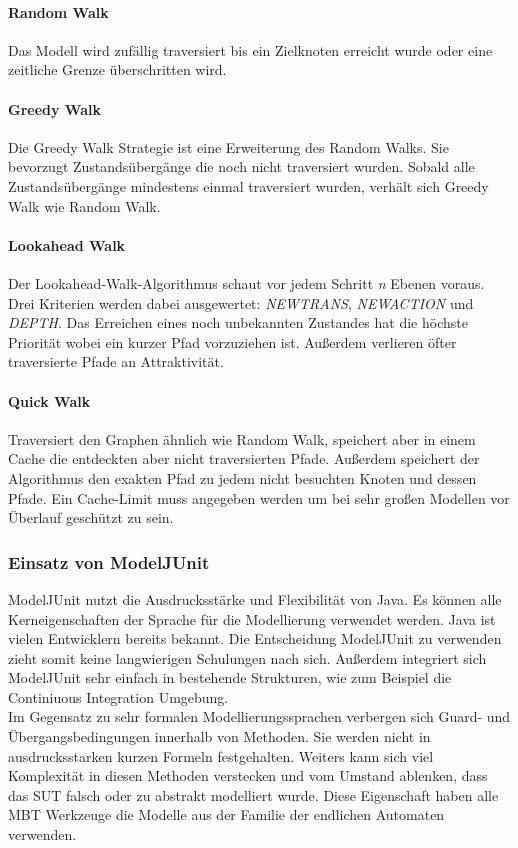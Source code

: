 
\paragraph{Random Walk}
Das Modell wird zufällig traversiert bis ein Zielknoten erreicht wurde oder eine zeitliche Grenze überschritten wird.

\paragraph{Greedy Walk}
Die Greedy Walk Strategie ist eine Erweiterung des Random Walks. Sie bevorzugt Zustandsübergänge die noch nicht traversiert wurden. Sobald alle Zustandsübergänge mindestens einmal traversiert wurden, verhält sich Greedy Walk wie Random Walk.

\paragraph{Lookahead Walk}
Der Lookahead-Walk-Algorithmus schaut vor jedem Schritt \textit{n} Ebenen voraus. Drei Kriterien werden dabei ausgewertet: \textit{NEWTRANS}, \textit{NEWACTION} und \textit{DEPTH}. Das Erreichen eines noch unbekannten Zustandes hat die höchste Priorität wobei ein kurzer Pfad vorzuziehen ist. Außerdem verlieren öfter traversierte Pfade an Attraktivität.

\paragraph{Quick Walk}
Traversiert den Graphen ähnlich wie Random Walk, speichert aber in einem Cache die entdeckten aber nicht traversierten Pfade. Außerdem speichert der Algorithmus den exakten Pfad zu jedem nicht besuchten Knoten und dessen Pfade. Ein Cache-Limit muss angegeben werden um bei sehr großen Modellen vor Überlauf geschützt zu sein.

\subsubsection{Einsatz von ModelJUnit}
ModelJUnit nutzt die Ausdrucksstärke und Flexibilität von Java. Es können alle Kerneigenschaften der Sprache für die Modellierung verwendet werden. Java ist vielen Entwicklern bereits bekannt. Die Entscheidung ModelJUnit zu verwenden zieht somit keine langwierigen Schulungen nach sich. Außerdem integriert sich ModelJUnit sehr einfach in bestehende Strukturen, wie zum Beispiel die Continiuous Integration Umgebung.\\
Im Gegensatz zu sehr formalen Modellierungssprachen verbergen sich Guard- und Übergangsbedingungen innerhalb von Methoden. Sie werden nicht in ausdrucksstarken kurzen Formeln festgehalten. Weiters kann sich viel Komplexität in diesen Methoden verstecken und vom Umstand ablenken, dass das SUT falsch oder zu abstrakt modelliert wurde. Diese Eigenschaft haben alle MBT Werkzeuge die Modelle aus der Familie der endlichen Automaten verwenden.

